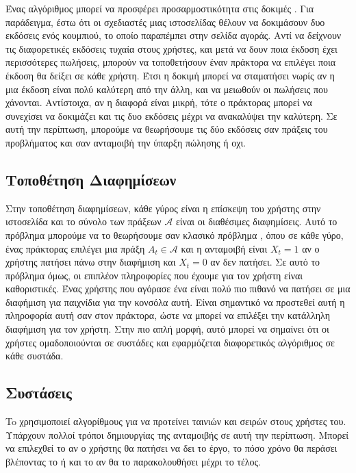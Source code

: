 Ένας αλγόριθμος  μπορεί να προσφέρει προσαρμοστικότητα στις δοκιμές . Για παράδειγμα, έστω ότι
οι σχεδιαστές μιας ιστοσελίδας θέλουν να δοκιμάσουν δυο εκδόσεις ενός κουμπιού, το οποίο παραπέμπει στην σελίδα αγοράς. Αντί να δείχνουν
τις διαφορετικές εκδόσεις τυχαία στους χρήστες, και μετά να δουν ποια έκδοση έχει περισσότερες πωλήσεις, μπορούν να τοποθετήσουν έναν πράκτορα
 να επιλέγει ποια έκδοση θα δείξει σε κάθε χρήστη. Έτσι η δοκιμή μπορεί να σταματήσει νωρίς αν η μια έκδοση είναι πολύ καλύτερη από την άλλη,
και να μειωθούν οι πωλήσεις που χάνονται. Αντίστοιχα, αν η διαφορά είναι μικρή, τότε ο πράκτορας μπορεί να συνεχίσει να δοκιμάζει και τις δυο εκδόσεις μέχρι να
ανακαλύψει την καλύτερη. Σε αυτή την περίπτωση, μπορούμε να θεωρήσουμε τις δύο εκδόσεις σαν πράξεις του προβλήματος και σαν ανταμοιβή την ύπαρξη πώλησης ή οχι.

\subsection{Τοποθέτηση Διαφημίσεων}

Στην τοποθέτηση διαφημίσεων, κάθε γύρος είναι η επίσκεψη του χρήστης στην ιστοσελίδα και το
σύνολο των πράξεων $\mathcal{A}$ είναι οι διαθέσιμες διαφημίσεις. Αυτό το πρόβλημα μπορούμε
να το θεωρήσουμε σαν κλασικό πρόβλημα , όπου σε κάθε γύρο, ένας πράκτορας
επιλέγει μια πράξη $A_t \in \mathcal{A}$ και η ανταμοιβή είναι $X_t = 1$ αν ο χρήστης
πατήσει πάνω στην διαφήμιση και $X_t = 0$ αν δεν πατήσει. Σε αυτό το πρόβλημα όμως, οι επιπλέον πληροφορίες που έχουμε για τον χρήστη είναι καθοριστικές.
Ένας χρήστης που αγόρασε ένα  είναι πολύ πιο πιθανό να πατήσει σε μια διαφήμιση για παιχνίδια για την κονσόλα αυτή. Είναι σημαντικό
να προστεθεί αυτή η πληροφορία αυτή σαν  στον πράκτορα, ώστε να μπορεί να επιλέξει την κατάλληλη διαφήμιση για τον χρήστη. Στην πιο απλή μορφή,
αυτό μπορεί να σημαίνει ότι οι χρήστες ομαδοποιούνται σε συστάδες και εφαρμόζεται διαφορετικός αλγόριθμος  σε κάθε συστάδα.

\subsection{Συστάσεις}

To  χρησιμοποιεί αλγορίθμους  για να προτείνει
\cite{ab-testing-artwork-netflix} ταινιών και σειρών στους χρήστες του. Υπάρχουν πολλοί τρόποι
δημιουργίας της ανταμοιβής σε αυτή την περίπτωση. Μπορεί να επιλεχθεί το αν ο χρήστης θα πατήσει να δει το έργο,
το πόσο χρόνο θα περάσει βλέποντας το ή και το αν θα το παρακολουθήσει μέχρι το τέλος.


